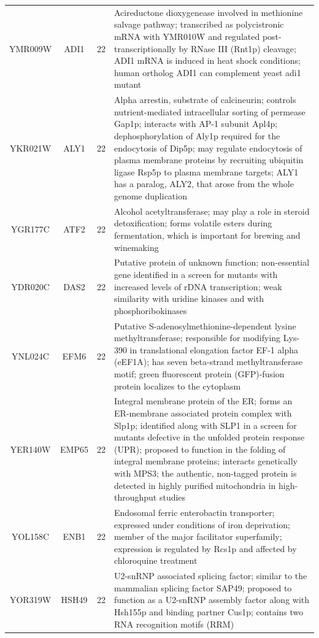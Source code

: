 \documentclass[]{article}
\begin{document}
\begin{longtable}{@{\extracolsep{3pt}} cccp{85mm}}
YMR009W & ADI1 & 22 & Acireductone dioxygenease involved in methionine salvage pathway; transcribed as polycistronic mRNA with YMR010W and regulated post-transcriptionally by RNase III (Rnt1p) cleavage; ADI1 mRNA is induced in heat shock conditions; human ortholog ADI1 can complement yeast adi1 mutant \\ 
YKR021W & ALY1 & 22 & Alpha arrestin, substrate of calcineurin; controls nutrient-mediated intracellular sorting of permease Gap1p; interacts with AP-1 subunit Apl4p; dephosphorylation of Aly1p required for the endocytosis of Dip5p; may regulate endocytosis of plasma membrane proteins by recruiting ubiquitin ligase Rsp5p to plasma membrane targets; ALY1 has a paralog, ALY2, that arose from the whole genome duplication \\ 
YGR177C & ATF2 & 22 & Alcohol acetyltransferase; may play a role in steroid detoxification; forms volatile esters during fermentation, which is important for brewing and winemaking \\ 
YDR020C & DAS2 & 22 & Putative protein of unknown function; non-essential gene identified in a screen for mutants with increased levels of rDNA transcription; weak similarity with uridine kinases and with phosphoribokinases \\ 
YNL024C & EFM6 & 22 & Putative S-adenosylmethionine-dependent lysine methyltransferase; responsible for modifying Lys-390 in translational elongation factor EF-1 alpha (eEF1A); has seven beta-strand methyltransferase motif; green fluorescent protein (GFP)-fusion protein localizes to the cytoplasm \\ 
YER140W & EMP65 & 22 & Integral membrane protein of the ER; forms an ER-membrane associated protein complex with Slp1p; identified along with SLP1 in a screen for mutants defective in the unfolded protein response (UPR); proposed to function in the folding of integral membrane proteins; interacts genetically with MPS3; the authentic, non-tagged protein is detected in highly purified mitochondria in high-throughput studies \\ 
YOL158C & ENB1 & 22 & Endosomal ferric enterobactin transporter; expressed under conditions of iron deprivation; member of the major facilitator superfamily; expression is regulated by Rcs1p and affected by chloroquine treatment \\ 
YOR319W & HSH49 & 22 & U2-snRNP associated splicing factor; similar to the mammalian splicing factor SAP49; proposed to function as a U2-snRNP assembly factor along with Hsh155p and binding partner Cus1p; contains two RNA recognition motifs (RRM) \\ 

\end{longtable}
\end{document}
